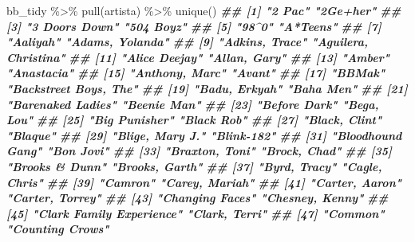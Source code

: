 \documentclass[
  11pt]{report}
\newenvironment{Shaded}{\begin{snugshade}}{\end{snugshade}}
\newcommand{\DocumentationTok}[1]{\textcolor[rgb]{0.56,0.35,0.01}{\textbf{\textit{#1}}}}
\newcommand{\FunctionTok}[1]{\textcolor[rgb]{0.00,0.00,0.00}{#1}}
\newcommand{\NormalTok}[1]{#1}
\newcommand{\SpecialCharTok}[1]{\textcolor[rgb]{0.00,0.00,0.00}{#1}}
\renewenvironment{Shaded}{
    \begin{mdframed}[%
      roundcorner=2pt,%
      innerleftmargin=5pt,%
      innerrightmargin=5pt,%
      topline=true,%
      leftline=true,%
      rightline=true,%
      bottomline=true,%
      linewidth=0.5pt,%
      linecolor=black!20,%
      backgroundcolor=black!2,%
      skipabove=2ex,%
      skipbelow=2.5ex%
    ]%
  }
  {
    \end{mdframed}
  }
\begin{document}
\begin{itemize}
\begin{Shaded}
\begin{Highlighting}[]
\NormalTok{bb\_tidy }\SpecialCharTok{\%\textgreater{}\%} 
  \FunctionTok{pull}\NormalTok{(artista) }\SpecialCharTok{\%\textgreater{}\%} 
  \FunctionTok{unique}\NormalTok{()}
\DocumentationTok{\#\#   [1] "2 Pac"                          "2Ge+her"                       }
\DocumentationTok{\#\#   [3] "3 Doors Down"                   "504 Boyz"                      }
\DocumentationTok{\#\#   [5] "98\^{}0"                           "A*Teens"                       }
\DocumentationTok{\#\#   [7] "Aaliyah"                        "Adams, Yolanda"                }
\DocumentationTok{\#\#   [9] "Adkins, Trace"                  "Aguilera, Christina"           }
\DocumentationTok{\#\#  [11] "Alice Deejay"                   "Allan, Gary"                   }
\DocumentationTok{\#\#  [13] "Amber"                          "Anastacia"                     }
\DocumentationTok{\#\#  [15] "Anthony, Marc"                  "Avant"                         }
\DocumentationTok{\#\#  [17] "BBMak"                          "Backstreet Boys, The"          }
\DocumentationTok{\#\#  [19] "Badu, Erkyah"                   "Baha Men"                      }
\DocumentationTok{\#\#  [21] "Barenaked Ladies"               "Beenie Man"                    }
\DocumentationTok{\#\#  [23] "Before Dark"                    "Bega, Lou"                     }
\DocumentationTok{\#\#  [25] "Big Punisher"                   "Black Rob"                     }
\DocumentationTok{\#\#  [27] "Black, Clint"                   "Blaque"                        }
\DocumentationTok{\#\#  [29] "Blige, Mary J."                 "Blink{-}182"                     }
\DocumentationTok{\#\#  [31] "Bloodhound Gang"                "Bon Jovi"                      }
\DocumentationTok{\#\#  [33] "Braxton, Toni"                  "Brock, Chad"                   }
\DocumentationTok{\#\#  [35] "Brooks \& Dunn"                  "Brooks, Garth"                 }
\DocumentationTok{\#\#  [37] "Byrd, Tracy"                    "Cagle, Chris"                  }
\DocumentationTok{\#\#  [39] "Cam\textquotesingle{}ron"                        "Carey, Mariah"                 }
\DocumentationTok{\#\#  [41] "Carter, Aaron"                  "Carter, Torrey"                }
\DocumentationTok{\#\#  [43] "Changing Faces"                 "Chesney, Kenny"                }
\DocumentationTok{\#\#  [45] "Clark Family Experience"        "Clark, Terri"                  }
\DocumentationTok{\#\#  [47] "Common"                         "Counting Crows"                }

\end{Highlighting}
\end{Shaded}
\end{itemize}
\end{document}
